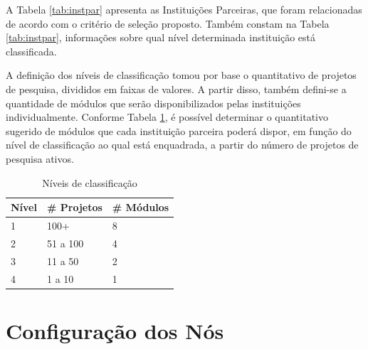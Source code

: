 \documentclass[tese,capa]{texufpel}
\begin{document}
A Tabela \ref{tab:instpar} apresenta as Instituições Parceiras, que foram relacionadas de acordo com o critério de seleção proposto. Também constam na Tabela \ref{tab:instpar}, informações sobre qual nível determinada instituição está classificada.

A definição dos níveis de classificação tomou por base o quantitativo de projetos de pesquisa, divididos em faixas de valores. A partir disso, também defini-se a quantidade de módulos que serão disponibilizados pelas instituições individualmente. Conforme Tabela \ref{tab:noporinst}, é possível determinar o quantitativo sugerido de módulos que cada instituição parceira poderá dispor, em função do nível de classificação ao qual está enquadrada, a partir do número de projetos de pesquisa ativos.

\begin{table}[H]
    \centering
    \caption{Níveis de classificação}
    \label{tab:noporinst}
    \begin{tabular}{@{}lll@{}}
        \toprule
        \textbf{Nível} & \textbf{\# Projetos} & \textbf{\# Módulos} \\ \midrule
        1              & 100+                 & 8               \\
        2              & 51 a 100             & 4               \\
        3              & 11 a 50              & 2               \\
        4              & 1 a 10               & 1               \\ \bottomrule
    \end{tabular}
\end{table}


\section{Configuração dos Nós}\label{sec:confnos}
\end{document}

